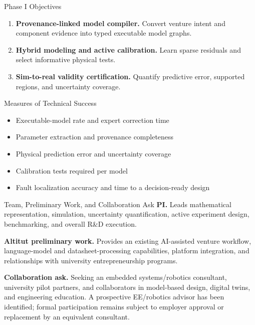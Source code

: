 \documentclass[a4paper,10pt]{article}
\begin{document}
\begin{minipage}[t]{0.49\textwidth}
\begin{vmBox}{Phase I Objectives}
\begin{enumerate}
\item \textbf{Provenance-linked model compiler.} Convert venture intent and component evidence into typed executable model graphs.
\item \textbf{Hybrid modeling and active calibration.} Learn sparse residuals and select informative physical tests.
\item \textbf{Sim-to-real validity certification.} Quantify predictive error, supported regions, and uncertainty coverage.
\end{enumerate}
\end{vmBox}
\end{minipage}
\hfill
\begin{minipage}[t]{0.49\textwidth}
\begin{vmBox}{Measures of Technical Success}
\begin{itemize}
\item Executable-model rate and expert correction time
\item Parameter extraction and provenance completeness
\item Physical prediction error and uncertainty coverage
\item Calibration tests required per model
\item Fault localization accuracy and time to a decision-ready design
\end{itemize}
\end{vmBox}
\end{minipage}

\begin{vmBox}{Team, Preliminary Work, and Collaboration Ask}
\textbf{PI.} Leads mathematical representation, simulation, uncertainty quantification, active experiment design, benchmarking, and overall R\&D execution.

\textbf{Altitut preliminary work.} Provides an existing AI-assisted venture workflow, language-model and datasheet-processing capabilities, platform integration, and relationships with university entrepreneurship programs.

\textbf{Collaboration ask.} Seeking an embedded systems/robotics consultant, university pilot partners, and collaborators in model-based design, digital twins, and engineering education. A prospective EE/robotics advisor has been identified; formal participation remains subject to employer approval or replacement by an equivalent consultant.
\end{vmBox}
\end{document}
